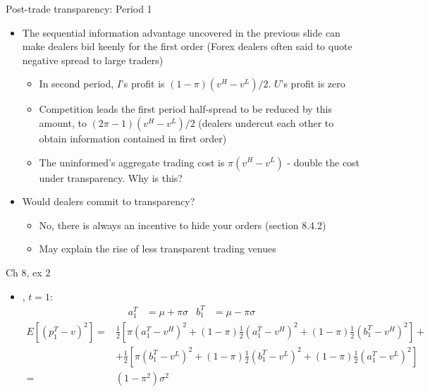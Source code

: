 \documentclass[english,10pt
,aspectratio=169
]{beamer}
\begin{document}
\begin{frame}{Post-trade transparency: Period 1}
	\begin{itemize}
		\item {} The sequential information advantage uncovered in the previous slide can make dealers bid keenly for the first order
		(Forex dealers often said to quote negative spread to large traders)
		\begin{itemize}
			\item In second period, $I$'s profit is $(1-\pi)(v^{H}-v^{L})/2$. $U$'s profit is zero
			\item Competition leads the first period half-spread to be reduced by this amount, to $(2\pi-1)(v^{H}-v^{L})/2$ (dealers undercut each other to obtain information contained in first order)
			\item The uninformed's aggregate trading cost is $\pi(v^{H}-v^{L})$ - double the cost under transparency. Why is this?
		\end{itemize}
		\item Would dealers commit to transparency?
		\begin{itemize}
			\item No, there is always an incentive to hide your orders (section 8.4.2)
			\item May explain the rise of less transparent trading venues
		\end{itemize}
	\end{itemize}
\end{frame}


\begin{frame}{Ch 8, ex 2}
	\begin{itemize}
		\item {}, $t=1$: 
		\begin{align*}
			a_1^T &= \mu + \pi \sigma
			&
			b_1^T &= \mu - \pi \sigma
		\end{align*}
		\begin{align*}
			E\left[ (p_{1}^{T}-v)^{2}\right] =& \frac{1}{2} \left[ \pi(a_1^T-v^H)^2 + (1-\pi)\frac{1}{2}(a_1^T-v^H)^2 + (1-\pi)\frac{1}{2}(b_1^T-v^H)^2 \right] +
			\\
			&+ \frac{1}{2} \left[ \pi(b_1^T-v^L)^2 + (1-\pi)\frac{1}{2}(b_1^T-v^L)^2 + (1-\pi)\frac{1}{2}(a_1^T-v^L)^2 \right]
			\\
			=& (1-\pi^2) \sigma^2
		\end{align*}
	\end{itemize}
\end{frame}
\end{document}
